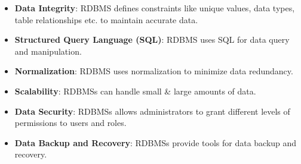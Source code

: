 \begin{flushleft}
	
	\begin{itemize}
		\item \textbf{Data Integrity}: RDBMS defines constraints like unique values, data types, table relationships etc. to maintain accurate data.
		
		
		
		\item \textbf{Structured Query Language (SQL)}: RDBMS uses SQL for data query and manipulation.
		
		\item \textbf{Normalization}: RDBMS uses normalization to minimize data redundancy.
		
		\item \textbf{Scalability}: RDBMSs can handle small \& large amounts of data.
		
		\item \textbf{Data Security}: RDBMSs allows administrators to grant different levels of permissions to users and roles.
		
		\item \textbf{Data Backup and Recovery}: RDBMSs provide tools for data backup and recovery.
		
	\end{itemize}

\end{flushleft}

\newpage
